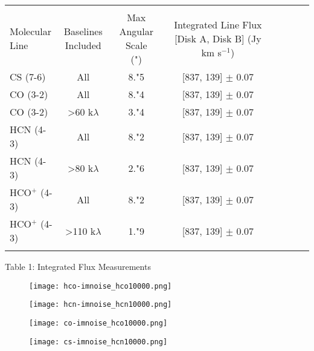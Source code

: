 
\bigskip
\bigskip

\begin{tabular}{l*{6}{c}r}
  \hline\hline \\

  \shortstack{Molecular \\ Line} & \shortstack{Baselines \\ Included} & \shortstack{Max Angular Scale \\ (")} & \shortstack{Integrated Line Flux [Disk A, Disk B]\\ (Jy km s$^{-1}$)} \\
  \hline
  CS (7-6)         & All                            & 8."5 & [837, 139] $\pm$ 0.07 \\
  CO (3-2)         & All                            & 8."4 & [837, 139] $\pm$ 0.07 \\
  CO (3-2)         & \textgreater 60 k$\lambda$     & 3."4 & [837, 139] $\pm$ 0.07 \\
  HCN (4-3)        & All                            & 8."2 & [837, 139] $\pm$ 0.07 \\
  HCN (4-3)        & \textgreater 80 k$\lambda$     & 2."6 & [837, 139] $\pm$ 0.07 \\
  HCO$^{+}$ (4-3)  & All                            & 8."2 & [837, 139] $\pm$ 0.07 \\
  HCO$^{+}$ (4-3)  & \textgreater 110 k$\lambda$    & 1."9 & [837, 139] $\pm$ 0.07 \\
  \hline
  \label{baseline_cutting_table}
\end{tabular}
\caption{Table 1: Integrated Flux Measurements}
\bigskip
\bigskip


\begin{figure}
\centering
\begin{minipage}{.48\textwidth}
  \centering
  \texttt{[image: hco-imnoise\_hco10000.png]}
  \label{fig:noise-profile_hco}
\end{minipage}%
\begin{minipage}{.48\textwidth}
  \centering
  \texttt{[image: hcn-imnoise\_hcn10000.png]}
  \label{fig:noise-profile_hcn}
\end{minipage}%
\par\medskip
\begin{minipage}{.48\textwidth}
  \centering
  \texttt{[image: co-imnoise\_hco10000.png]}
  \label{fig:noise-profile_co}
\end{minipage}%
\begin{minipage}{.48\textwidth}
  \centering
  \texttt{[image: cs-imnoise\_hcn10000.png]}
  \label{fig:noise-profile_cs}
\end{minipage}
\end{figure}






